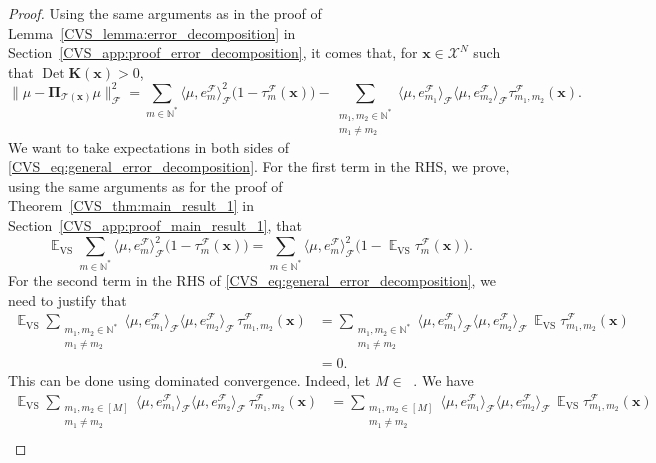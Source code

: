 \documentclass[twoside,11pt]{book}
\numberwithin{theorem}{chapter}
\numberwithin{definition}{chapter}
\numberwithin{proposition}{chapter}
\numberwithin{corollary}{chapter}
\numberwithin{example}{chapter}
\numberwithin{lemma}{chapter}
\numberwithin{assumption}{chapter}
\numberwithin{equation}{chapter}
\numberwithin{figure}{chapter}
\DeclareMathOperator{\Det}{Det}
\DeclareMathOperator{\VS}{\mathrm{VS}}
\DeclareMathOperator{\EX}{\mathbb{E}}
\DeclareMathOperator{\F}{\mathcal{F}}
\DeclareMathOperator{\Ns}{\mathbb{N}^{*}}
\begin{document}
\begin{proof}
Using the same arguments as in the proof of Lemma~\ref{CVS_lemma:error_decomposition} in Section~\ref{CVS_app:proof_error_decomposition}, it comes that,
for $\bm{x} \in \mathcal{X}^{N}$ such that $\Det \bm{K}(\bm{x}) > 0$,
\begin{equation}\label{CVS_eq:general_error_decomposition}
\|\mu - \bm{\Pi}_{\mathcal{T}(\bm{x})} \mu\|_{\F}^{2}  = \sum\limits_{m \in \mathbb{N}^{*}} \langle \mu, e_{m}^{\F} \rangle_{\F}^{2}\bigg(1- \tau_{m}^{\F}(\bm{x})\bigg) - \sum\limits_{\substack{m_{1},m_{2} \in \mathbb{N}^{*} \\ m_{1} \neq m_{2}}}  \langle \mu, e_{m_{1}}^{\F} \rangle_{\F} \langle \mu, e_{m_{2}}^{\F} \rangle_{\F} \tau_{m_{1},m_{2}}^{\F}(\bm{x}).
\end{equation}
We want to take expectations in both sides of \eqref{CVS_eq:general_error_decomposition}. For the first term in the RHS, we prove, using the same arguments as for the proof of Theorem~\ref{CVS_thm:main_result_1} in Section~\ref{CVS_app:proof_main_result_1}, that
\begin{equation}\label{CVS_eq:EX_VS_lvs_interpolation}
\EX_{\VS} \sum\limits_{m \in \mathbb{N}^{*}} \langle \mu, e_{m}^{\F} \rangle_{\F}^{2}\bigg(1- \tau_{m}^{\F}(\bm{x})\bigg) = \sum\limits_{m \in \mathbb{N}^{*}} \langle \mu, e_{m}^{\F} \rangle_{\F}^{2}\bigg(1- \EX_{\VS}\tau_{m}^{\F}(\bm{x})\bigg).
\end{equation}
For the second term in the RHS of \eqref{CVS_eq:general_error_decomposition}, we need to justify that
\begin{align}
\EX_{\VS} \sum\limits_{\substack{m_{1},m_{2} \in \mathbb{N}^{*} \\ m_{1} \neq m_{2}}}  \langle \mu, e_{m_{1}}^{\F} \rangle_{\F} \langle \mu, e_{m_{2}}^{\F} \rangle_{\F} \, \tau_{m_{1},m_{2}}^{\F}(\bm{x})& = \sum\limits_{\substack{m_{1},m_{2} \in \mathbb{N}^{*} \\ m_{1} \neq m_{2}}}  \langle \mu, e_{m_{1}}^{\F} \rangle_{\F} \langle \mu, e_{m_{2}}^{\F} \rangle_{\F} \,\EX_{\VS}\tau_{m_{1},m_{2}}^{\F}(\bm{x}) \nonumber\\
& = 0.
\label{CVS_eq:EX_VS_cross_lvs_interpolation}
\end{align}
This can be done using dominated convergence. Indeed, let $M \in \Ns$. We have
\begin{align}
\EX_{\VS} \sum\limits_{\substack{m_{1},m_{2} \in [M] \\ m_{1} \neq m_{2}}}  \langle \mu, e_{m_{1}}^{\F} \rangle_{\F} \langle \mu, e_{m_{2}}^{\F} \rangle_{\F} \,\tau_{m_{1},m_{2}}^{\F}(\bm{x}) & =  \sum\limits_{\substack{m_{1},m_{2} \in [M] \\ m_{1} \neq m_{2}}}  \langle \mu, e_{m_{1}}^{\F} \rangle_{\F} \langle \mu, e_{m_{2}}^{\F} \rangle_{\F} \,\EX_{\VS} \tau_{m_{1},m_{2}}^{\F}(\bm{x}) \nonumber \\ 

\end{align}
\end{proof}
\end{document}
